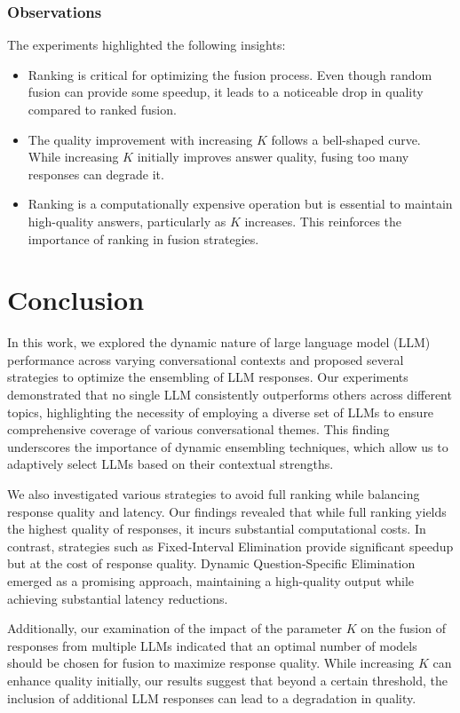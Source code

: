 \documentclass[sigconf,authordraft]{acmart}
\begin{document}
\subsubsection{Observations}
The experiments highlighted the following insights:
\begin{itemize}
    \item Ranking is critical for optimizing the fusion process. Even though random fusion can provide some speedup, it leads to a noticeable drop in quality compared to ranked fusion.
    \item The quality improvement with increasing \( K \) follows a bell-shaped curve. While increasing \( K \) initially improves answer quality, fusing too many responses can degrade it.
    \item Ranking is a computationally expensive operation but is essential to maintain high-quality answers, particularly as \( K \) increases. This reinforces the importance of ranking in fusion strategies.
\end{itemize}



\section{Conclusion}
In this work, we explored the dynamic nature of large language model (LLM) performance across varying conversational contexts and proposed several strategies to optimize the ensembling of LLM responses. Our experiments demonstrated that no single LLM consistently outperforms others across different topics, highlighting the necessity of employing a diverse set of LLMs to ensure comprehensive coverage of various conversational themes. This finding underscores the importance of dynamic ensembling techniques, which allow us to adaptively select LLMs based on their contextual strengths.

We also investigated various strategies to avoid full ranking while balancing response quality and latency. Our findings revealed that while full ranking yields the highest quality of responses, it incurs substantial computational costs. In contrast, strategies such as Fixed-Interval Elimination provide significant speedup but at the cost of response quality. Dynamic Question-Specific Elimination emerged as a promising approach, maintaining a high-quality output while achieving substantial latency reductions.

Additionally, our examination of the impact of the parameter \( K \) on the fusion of responses from multiple LLMs indicated that an optimal number of models should be chosen for fusion to maximize response quality. While increasing \( K \) can enhance quality initially, our results suggest that beyond a certain threshold, the inclusion of additional LLM responses can lead to a degradation in quality.
\end{document}

